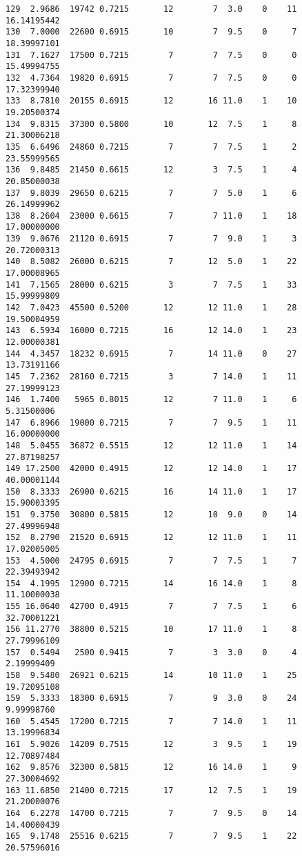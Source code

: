 \documentclass[
  letterpaper,
  DIV=11,
  numbers=noendperiod]{scrreprt}
\begin{document}
\begin{verbatim}
129  2.9686  19742 0.7215       12        7  3.0    0    11 16.14195442
130  7.0000  22600 0.6915       10        7  9.5    0     7 18.39997101
131  7.1627  17500 0.7215        7        7  7.5    0     0 15.49994755
132  4.7364  19820 0.6915        7        7  7.5    0     0 17.32399940
133  8.7810  20155 0.6915       12       16 11.0    1    10 19.20500374
134  9.8315  37300 0.5800       10       12  7.5    1     8 21.30006218
135  6.6496  24860 0.7215        7        7  7.5    1     2 23.55999565
136  9.8485  21450 0.6615       12        3  7.5    1     4 20.85000038
137  9.8039  29650 0.6215        7        7  5.0    1     6 26.14999962
138  8.2604  23000 0.6615        7        7 11.0    1    18 17.00000000
139  9.0676  21120 0.6915        7        7  9.0    1     3 20.72000313
140  8.5082  26000 0.6215        7       12  5.0    1    22 17.00008965
141  7.1565  28000 0.6215        3        7  7.5    1    33 15.99999809
142  7.0423  45500 0.5200       12       12 11.0    1    28 19.50004959
143  6.5934  16000 0.7215       16       12 14.0    1    23 12.00000381
144  4.3457  18232 0.6915        7       14 11.0    0    27 13.73191166
145  7.2362  28160 0.7215        3        7 14.0    1    11 27.19999123
146  1.7400   5965 0.8015       12        7 11.0    1     6  5.31500006
147  6.8966  19000 0.7215        7        7  9.5    1    11 16.00000000
148  5.0455  36872 0.5515       12       12 11.0    1    14 27.87198257
149 17.2500  42000 0.4915       12       12 14.0    1    17 40.00001144
150  8.3333  26900 0.6215       16       14 11.0    1    17 15.90003395
151  9.3750  30800 0.5815       12       10  9.0    0    14 27.49996948
152  8.2790  21520 0.6915       12       12 11.0    1    11 17.02005005
153  4.5000  24795 0.6915        7        7  7.5    1     7 22.39493942
154  4.1995  12900 0.7215       14       16 14.0    1     8 11.10000038
155 16.0640  42700 0.4915        7        7  7.5    1     6 32.70001221
156 11.2770  38800 0.5215       10       17 11.0    1     8 27.79996109
157  0.5494   2500 0.9415        7        3  3.0    0     4  2.19999409
158  9.5480  26921 0.6215       14       10 11.0    1    25 19.72095108
159  5.3333  18300 0.6915        7        9  3.0    0    24  9.99998760
160  5.4545  17200 0.7215        7        7 14.0    1    11 13.19996834
161  5.9026  14209 0.7515       12        3  9.5    1    19 12.70897484
162  9.8576  32300 0.5815       12       16 14.0    1     9 27.30004692
163 11.6850  21400 0.7215       17       12  7.5    1    19 21.20000076
164  6.2278  14700 0.7215        7        7  9.5    0    14 14.40000439
165  9.1748  25516 0.6215        7        7  9.5    1    22 20.57596016

\end{verbatim}
\end{document}
